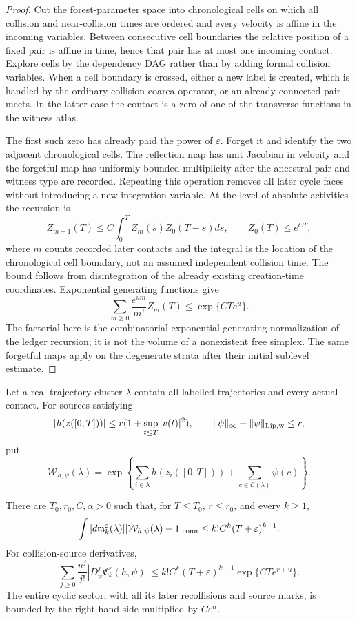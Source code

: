\begin{proof}
Cut the forest-parameter space into chronological cells on which all collision
and near-collision times are ordered and every velocity is affine in the
incoming variables.  Between consecutive cell boundaries the relative
position of a fixed pair is affine in time, hence that pair has at most one
incoming contact.  Explore cells by the dependency DAG rather than by adding
formal collision variables.  When a cell boundary is crossed, either a new
label is created, which is handled by the ordinary collision-coarea operator,
or an already connected pair meets.  In the latter case the contact is a zero
of one of the transverse functions in the witness atlas.

The first such zero has already paid the power of \(\varepsilon\).  Forget it
and identify the two adjacent chronological cells.  The reflection map has
unit Jacobian in velocity and the forgetful map has uniformly bounded
multiplicity after the ancestral pair and witness type are recorded.  Repeating
this operation removes all later cycle faces without introducing a new
integration variable.  At the level of absolute activities the recursion is
\[
 Z_{m+1}(T)
 \le C\int_0^T Z_m(s)Z_0(T-s)ds,
 \qquad Z_0(T)\le e^{CT},
\]
where \(m\) counts recorded later contacts and the integral is the location of
the chronological cell boundary, not an assumed independent collision time.
The bound follows from disintegration of the already existing creation-time
coordinates.  Exponential generating functions give
\[
 \sum_{m\ge0}\frac{e^{um}}{m!}Z_m(T)
 \le\exp\{CTe^u\}.
\]
The factorial here is the combinatorial exponential-generating normalization
of the ledger recursion; it is not the volume of a nonexistent free simplex.
The same forgetful maps apply on the degenerate strata after their initial
sublevel estimate.
\end{proof}

Let a real trajectory cluster \(\lambda\) contain all labelled trajectories
and every actual contact.  For sources satisfying
\[
 |h(z([0,T]))|
 \le r(1+\sup_{t\le T}|v(t)|^2),
 \qquad
 \|\psi\|_\infty+\|\psi\|_{\rm Lip,w}\le r,
\]
put
\[
 \mathcal W_{h,\psi}(\lambda)
 =\exp\left\{
 \sum_{i\in\lambda}h(z_i([0,T]))+
 \sum_{c\in\mathcal C(\lambda)}\psi(c)
 \right\}.
\]

\begin{theorem}
\label{lem:r3-b2-generating}
There are \(T_0,r_0,C,\alpha>0\) such that, for \(T\le T_0\),
\(r\le r_0\), and every \(k\ge1\),
\[
 \int|d\mathfrak m_k^\varepsilon(\lambda)|
 |\mathcal W_{h,\psi}(\lambda)-1|_{\rm conn}
 \le k!C^k(T+\varepsilon)^{k-1}.
\]
For collision-source derivatives,
\[
 \sum_{j\ge0}\frac{u^j}{j!}
 |D_\psi^j\mathfrak C_k^\varepsilon(h,\psi)|
 \le k!C^k(T+\varepsilon)^{k-1}
 \exp\{CTe^{r+u}\}.
\]
The entire cyclic sector, with all its later recollisions and source marks, is
bounded by the right-hand side multiplied by
\(C\varepsilon^\alpha\).
\end{theorem}


